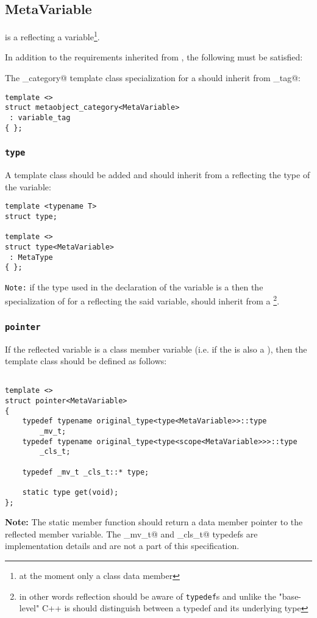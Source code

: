 \subsection{MetaVariable}
\label{concept-MetaVariable}

 is a  reflecting a variable\footnote{
at the moment only a class data member}.

In addition to the requirements inherited from , the following must
be satisfied:

The \verb@metaobject_category@ template class specialization for a  should
inherit from \verb@variable_tag@:

\begin{verbatim}
template <>
struct metaobject_category<MetaVariable>
 : variable_tag
{ };
\end{verbatim}

\subsubsection{\texttt{type}}

A template class \verb@type@ should be added and should inherit
from a  reflecting the type of the variable:

\begin{verbatim}
template <typename T>
struct type;

template <>
struct type<MetaVariable>
 : MetaType
{ };
\end{verbatim}

\texttt{Note:} if the type used in the declaration of the variable
is a \verb@typedef@ then the specialization of \verb@type@ for
a  reflecting the said variable, should
inherit from a \footnote{in other words reflection
should be aware of \texttt{typedef}s and unlike the "base-level" C++
is should distinguish between a typedef and its underlying type}.

\subsubsection{\texttt{pointer}}

If the reflected variable is a class member variable (i.e. if the 
is also a ), then the \verb@pointer@ template class should be
defined as follows:

\begin{verbatim}

template <>
struct pointer<MetaVariable>
{
	typedef typename original_type<type<MetaVariable>>::type
		_mv_t;
	typedef typename original_type<type<scope<MetaVariable>>>::type
		_cls_t;

	typedef _mv_t _cls_t::* type;

	static type get(void);
};

\end{verbatim}

\textbf{Note:} The static member function \verb@get@ should return a data member pointer to
the reflected member variable. The \verb@_mv_t@ and \verb@_cls_t@ typedefs
are implementation details and are not a part of this specification.
